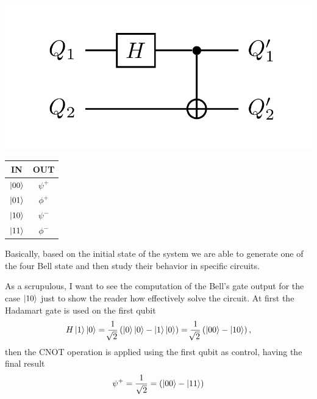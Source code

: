 \begin{minipage}{0.45\textwidth}
    \centering
    \includegraphics[width=\textwidth]{Immagini/BellCirc.pdf}
\end{minipage}
\hspace{-1cm}
\begin{minipage}{0.45\textwidth}
    \centering
    \begin{tabular}{c|c}
        \textbf{IN} & \textbf{OUT}\\
        \midrule
        $\ket{00}$ & $\psi^+$\\
        $\ket{01}$ & $\phi^+$\\
        $\ket{10}$ & $\psi^-$\\
        $\ket{11}$ & $\phi^-$
    \end{tabular}
\end{minipage}
\vspace{0.3cm}

\noindent
Basically, based on the initial state of the system we are able to generate one of the four Bell state and then study their behavior in specific circuits. 

{
    As a scrupulous, I want to see the computation of the Bell's gate output for the case $\ket{10}$ just to show the reader how effectively solve the circuit. At first the Hadamart gate is used on the first qubit
    \begin{equation}
        H\ket{1}\ket{0} = \frac{1}{\sqrt[]{2}}\left( \ket{0}\ket{0} - \ket{1}\ket{0} \right) = \frac{1}{\sqrt[]{2}}\left( \ket{00} - \ket{10} \right),
    \end{equation}
    then the CNOT operation is applied using the first qubit as control, having the final result
    \begin{equation}
        \psi^+ = \frac{1}{\sqrt{2}} = \left( \ket{00} - \ket{11} \right)
    \end{equation}
}

